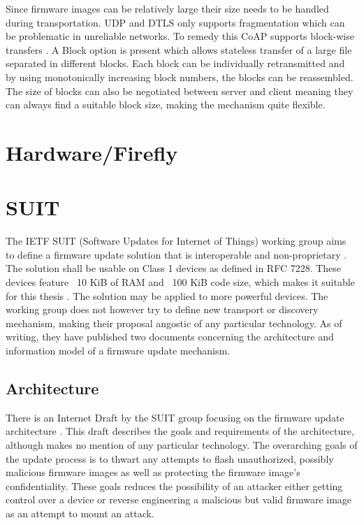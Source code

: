 \documentclass[0-thesis.tex]{subfiles}
\begin{document}
Since firmware images can be relatively large their size needs to be handled during
transportation. UDP and DTLS only supports fragmentation which can be problematic in
unreliable networks. To remedy this CoAP supports block-wise transfers
\parencite{rfc7959}. A Block option is present which allows stateless transfer of a large
file separated in different blocks. Each block can be individually retransmitted and by
using monotonically increasing block numbers, the blocks can be reassembled. The size of
blocks can also be negotiated between server and client meaning they can always find a
suitable block size, making the mechanism quite flexible.

\section{Hardware/Firefly}
\label{sec:hardware}

\section{SUIT}
\label{sec:suit}
The IETF SUIT (Software Updates for Internet of Things) working group aims to define a
firmware update solution that is interoperable and non-proprietary \parencite{suit}. The
solution shall be usable on Class 1 devices as defined in RFC 7228. These devices feature
~10 KiB of RAM and ~100 KiB code size, which makes it suitable for this thesis
\parencite{rfc7228}. The solution may be applied to more powerful devices. The working
group does not however try to define new transport or discovery mechanism, making their
proposal angostic of any particular technology. As of writing, they have published two
documents concerning the architecture and information model of a firmware update
mechanism.

\subsection{Architecture}
\label{ssec:architecture}
There is an Internet Draft by the SUIT group focusing on the firmware update architecture
\parencite{suit-architecture}. This draft describes the goals and requirements of the
architecture, although makes no mention of any particular technology. The overarching
goals of the update process is to thwart any attempts to flash unauthorized, possibly
malicious firmware images as well as protecting the firmware image's confidentiality.
These goals reduces the possibility of an attacker either getting control over a device or
reverse engineering a malicious but valid firmware image as an attempt to mount an attack.
\end{document}
